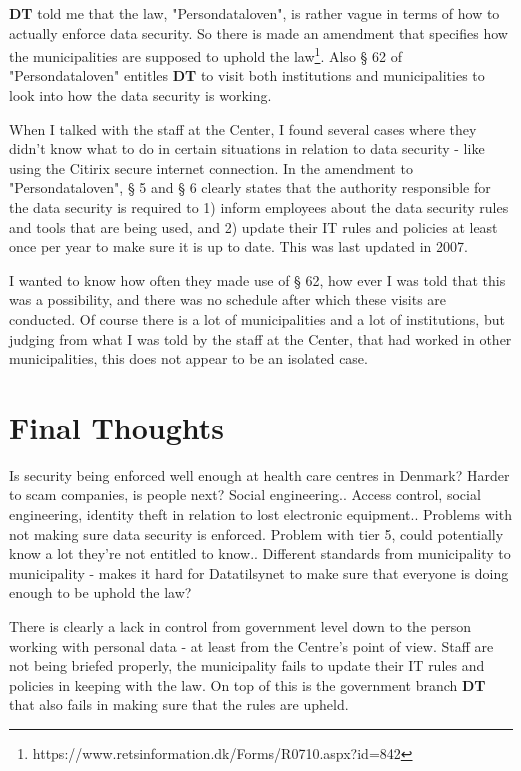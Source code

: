 \documentclass[11pt]{article}
\begin{document}
\textbf{DT} told me that the law, "Persondataloven", is rather vague in terms of how to actually enforce data security. So there is made an amendment that specifies how the municipalities are supposed to uphold the law\footnote{https://www.retsinformation.dk/Forms/R0710.aspx?id=842}. Also § 62 of "Persondataloven" entitles \textbf{DT} to visit both institutions and municipalities to look into how the data security is working.

When I talked with the staff at the Center, I found several cases where they didn't know what to do in certain situations in relation to data security - like using the Citirix secure internet connection. In the amendment to "Persondataloven", § 5 and § 6 clearly states that the authority responsible for the data security is required to 1) inform employees about the data security rules and tools that are being used, and 2) update their IT rules and policies at least once per year to make sure it is up to date. This was last updated in 2007. 

I wanted to know how often they made use of § 62, how ever I was told that this was a possibility, and there was no schedule after which these visits are conducted. Of course there is a lot of municipalities and a lot of institutions, but judging from what I was told by the staff at the Center, that had worked in other municipalities, this does not appear to be an isolated case.

\section{Final Thoughts}
Is security being enforced well enough at health care centres in Denmark?
Harder to scam companies, is people next? Social engineering..
Access control, social engineering, identity theft in relation to lost electronic equipment..
Problems with not making sure data security is enforced.
Problem with tier 5, could potentially know a lot they're not entitled to know..
Different standards from municipality to municipality - makes it hard for Datatilsynet to make sure that everyone is doing enough to be uphold the law?

There is clearly a lack in control from government level down to the person working with personal data - at least from the Centre's point of view. Staff are not being briefed properly, the municipality fails to update their IT rules and policies in keeping with the law. On top of this is the government branch \textbf{DT} that also fails in making sure that the rules are upheld.
\end{document}
